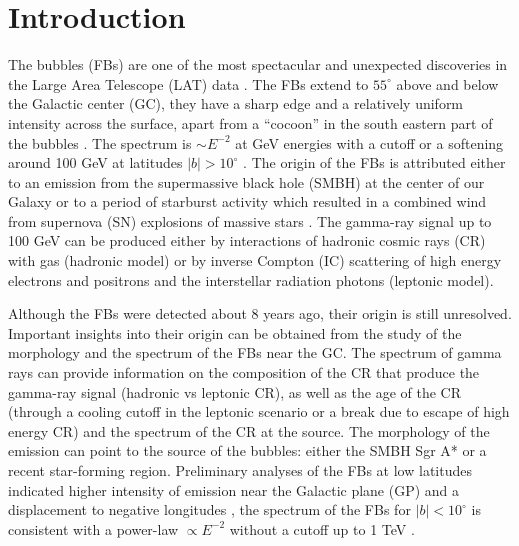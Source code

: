 \section{Introduction}



The \Fermi bubbles (FBs) are one of the most spectacular and unexpected discoveries 
in the \Fermi Large Area Telescope (LAT) data \citep{2010ApJ...724.1044S}.
The FBs extend to $55^\circ$ above and below the Galactic center (GC),
they have a sharp edge and a relatively uniform intensity across the surface, apart from a ``cocoon'' in the south eastern part of the bubbles
\citep{2012ApJ...753...61S, 2014ApJ...793...64A}.
The spectrum is $\sim E^{-2}$ at GeV energies with a cutoff or a softening around 100 GeV at latitudes $|b| > 10^\circ$ \citep{2014ApJ...793...64A}.
The origin of the FBs is attributed either to an emission from the supermassive black hole (SMBH) at
the center of our Galaxy %
or to a period of starburst activity which resulted in a combined wind
from supernova (SN) explosions of massive stars %
\citep{2010ApJ...724.1044S}.
The gamma-ray signal up to 100 GeV can be produced either by interactions of hadronic cosmic rays (CR) with gas (hadronic model)
or by inverse Compton (IC) scattering of high energy electrons and positrons and the interstellar radiation photons (leptonic model).

Although the FBs were detected about 8 years ago, their origin is still unresolved.
Important insights into their origin can be obtained from the study of the morphology and the spectrum of the FBs near the GC.
The spectrum of gamma rays can provide information on the composition of the 
CR that produce the gamma-ray signal (hadronic vs leptonic CR),
as well as the age of the CR (through a cooling cutoff in the leptonic scenario or a break due to escape of high energy CR)
and the spectrum of the CR at the source.
The morphology of the emission can point to the source of the bubbles: either the SMBH Sgr A* or a recent star-forming region.
Preliminary analyses of the FBs at low latitudes indicated higher intensity of emission near the Galactic plane (GP) and a displacement
to negative longitudes \citep{2016ApJS..223...26A, 2017ApJ...840...43A, 2017JCAP...08..022S},
the spectrum of the FBs for $|b| < 10^\circ$ is consistent with a power-law $\propto E^{-2}$ 
without a cutoff up to 1 TeV \citep{2017ApJ...840...43A}.

